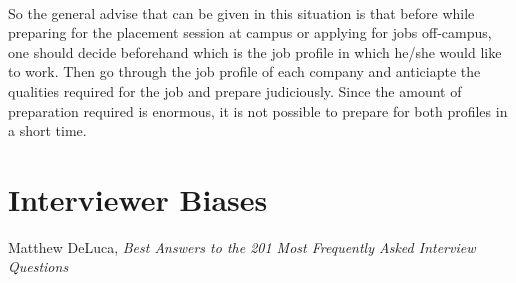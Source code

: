 \documentclass[a4paper,12pt]{report}
\begin{document}
\subsubsection{}
So the general advise that can be given in this situation is that before while preparing for the placement session 
at campus or applying for jobs off-campus, one should decide beforehand which is the job profile in which he/she would like to work. 
Then go through the job profile of each company and anticiapte the qualities required for the job and prepare judiciously.
Since the amount of preparation required is enormous, it is not possible to prepare for both profiles in a short time.

\chapter{Interviewer Biases}
\begin{thebibliography}{9}
  Matthew DeLuca,
  \emph{Best Answers to the 201 Most Frequently Asked Interview Questions}
\end{thebibliography}
\end{document}
